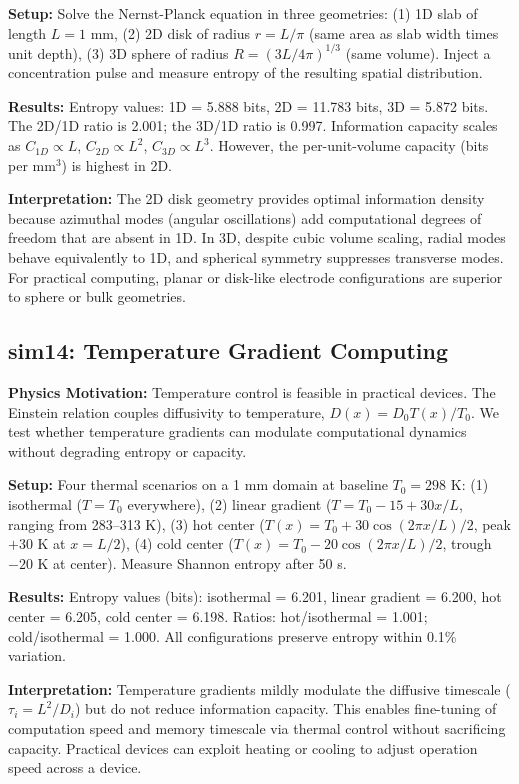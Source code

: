 \documentclass[11pt]{article}
\begin{document}
\textbf{Setup:} Solve the Nernst-Planck equation in three geometries: (1) 1D slab of length $L = 1$ mm, (2) 2D disk of radius $r = L/\pi$ (same area as slab width times unit depth), (3) 3D sphere of radius $R = (3L/4\pi)^{1/3}$ (same volume). Inject a concentration pulse and measure entropy of the resulting spatial distribution.

\textbf{Results:} Entropy values: 1D = 5.888 bits, 2D = 11.783 bits, 3D = 5.872 bits. The 2D/1D ratio is 2.001; the 3D/1D ratio is 0.997. Information capacity scales as $C_{1D} \propto L$, $C_{2D} \propto L^2$, $C_{3D} \propto L^3$. However, the per-unit-volume capacity (bits per mm$^3$) is highest in 2D.

\textbf{Interpretation:} The 2D disk geometry provides optimal information density because azimuthal modes (angular oscillations) add computational degrees of freedom that are absent in 1D. In 3D, despite cubic volume scaling, radial modes behave equivalently to 1D, and spherical symmetry suppresses transverse modes. For practical computing, planar or disk-like electrode configurations are superior to sphere or bulk geometries.

\subsection{sim14: Temperature Gradient Computing}

\textbf{Physics Motivation:} Temperature control is feasible in practical devices. The Einstein relation couples diffusivity to temperature, $D(x) = D_0 T(x)/T_0$. We test whether temperature gradients can modulate computational dynamics without degrading entropy or capacity.

\textbf{Setup:} Four thermal scenarios on a 1 mm domain at baseline $T_0 = 298$ K: (1) isothermal ($T = T_0$ everywhere), (2) linear gradient ($T = T_0 - 15 + 30x/L$, ranging from 283–313 K), (3) hot center ($T(x) = T_0 + 30\cos(2\pi x/L)/2$, peak $+30$ K at $x = L/2$), (4) cold center ($T(x) = T_0 - 20\cos(2\pi x/L)/2$, trough $-20$ K at center). Measure Shannon entropy after 50 s.

\textbf{Results:} Entropy values (bits): isothermal = 6.201, linear gradient = 6.200, hot center = 6.205, cold center = 6.198. Ratios: hot/isothermal = 1.001; cold/isothermal = 1.000. All configurations preserve entropy within 0.1\% variation.

\textbf{Interpretation:} Temperature gradients mildly modulate the diffusive timescale ($\tau_i = L^2/D_i$) but do not reduce information capacity. This enables fine-tuning of computation speed and memory timescale via thermal control without sacrificing capacity. Practical devices can exploit heating or cooling to adjust operation speed across a device.
\end{document}
